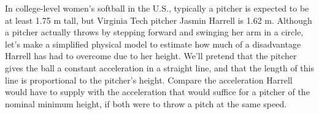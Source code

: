 In college-level women's softball in the U.S., typically a pitcher is expected
to be at least 1.75 m tall, but Virginia Tech pitcher Jasmin Harrell is 1.62 m.
Although a pitcher actually throws by stepping forward and swinging her arm in
a circle, let's make a simplified physical model to estimate how much of a disadvantage
Harrell has had to overcome due to her height. We'll pretend that the pitcher gives the ball a constant acceleration
in a straight line, and that the length of this line is proportional to the pitcher's
height. Compare the acceleration Harrell would have to supply with the acceleration
that would suffice for a pitcher of the nominal
minimum height, if both were to throw a pitch at the same speed.\answercheck
